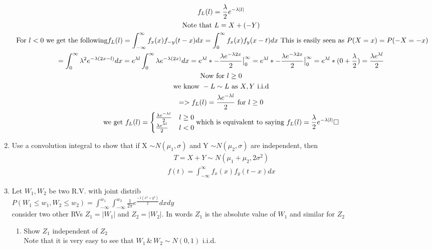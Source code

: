 \documentclass[11pt]{article}
\begin{document}
\begin{enumerate}
\begin{gather}
	f_L(l) = \frac{\lambda}{2}e^{-\lambda|l|}\\
	\text{Note that } L = X + (-Y)\\
	\text{ For } l < 0 \text{ we get the following}
	f_L(l) = \int_{-\infty}^{\infty}f_x(x)f_{-y}(t-x)dx =  \int_{0}^{\infty}f_x(x)f_{y}(x-t)dx \text{ This is easily seen as } P(X=x)=P(-X=-x)\\
	=\int_{0}^{\infty}\lambda^2 e^{-\lambda(2x-l)}dx = e^{\lambda l}\int_{0}^{\infty}\lambda e^{-\lambda(2x)}dx = e^{\lambda l} * -\frac{\lambda e^{-\lambda 2x}}{2}\big{|}_0^\infty =  e^{\lambda l} * -\frac{\lambda e^{-\lambda 2x}}{2}\big{|}_0^\infty = e^{\lambda l} * (0+\frac{\lambda}{2}) = \frac{\lambda e^{\lambda l}}{2}\\
	\text{Now for } l\ge 0\\
	\text{ we  know } -L \sim L \text{ as } X,Y \text{ i.i.d }\\
	=> f_L(l) = \frac{\lambda e^{-\lambda l}}{2} \text{ for } l \ge0\\
	\text{we get  }
	f_L(l)=
	\begin{cases}
		\frac{\lambda e^{-\lambda l}}{2} & l \ge 0 \\
		\frac{\lambda e^{\lambda l}}{2} & l < 0\\
	\end{cases}
	\text{which is equivalent to saying } 	
	f_L(l) = \frac{\lambda}{2}e^{-\lambda|l|} \square
\end{gather}
\item Use a convolution integral to show that if X $\sim N(\mu_1,\sigma)$ and Y $\sim N(\mu_2,\sigma)$ are independent, then
\begin{gather}
	T=X+Y\sim N(\mu_1+\mu_2,2\sigma^2)
\end{gather}
\begin{gather}
	f(t)=\int_{-\infty}^{\infty}f_x(x)f_y(t-x)dx 
\end{gather}
\item Let $W_1, W_2$ be two R.V. with joint distrib\\
$P(W_1\le w_1, W_2 \le w_2) = \int_{-\infty}^{w_1}\int_{-\infty}^{w_2} \frac{1}{2\pi}e^{\frac{-1(x^2+y^2)}{2}}dxdy$\\
consider two other RVs $Z_1 = |W_1|$ and $Z_2=|W_2|$. In words $Z_1$ is the absolute value of $W_1$ and similar for $Z_2$
\begin{enumerate}
	\item Show $Z_1$ independent of $Z_2$
	\\
	Note that it is very easy to see that $W_1 \, \& \, W_2 \sim N(0,1)$ i.i.d.

\end{enumerate}
\end{enumerate}
\end{document}

